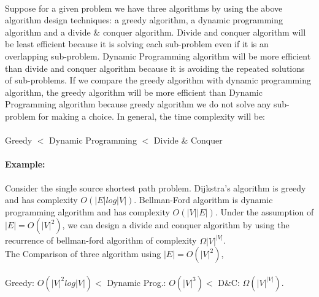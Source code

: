 \documentclass[12pt]{article}
\begin{document}
\maketitle

\paragraph{}
Suppose for a given problem we have three algorithms by using the above algorithm design techniques: a greedy algorithm, a dynamic programming algorithm and a divide \& conquer algorithm. Divide and conquer algorithm will be least efficient because it is solving each sub-problem even if it is an overlapping sub-problem. Dynamic Programming algorithm will be more efficient than divide and conquer algorithm because it is avoiding the repeated solutions of sub-problems. If we compare the greedy algorithm with dynamic programming algorithm, the greedy algorithm will be more efficient than Dynamic Programming algorithm because greedy algorithm we do not solve any sub-problem for making a choice. In general, the time complexity will be:
\\
\\
Greedy $<$ Dynamic Programming $<$ Divide \& Conquer

\paragraph{Example:}
Consider the single source shortest path problem. Dijkstra's algorithm is greedy and has complexity $O(|E|log|V|)$. Bellman-Ford algorithm is dynamic programming algorithm and has complexity $O(|V||E|)$. Under the assumption of $|E| = O(|V|^2)$, we can design a divide and conquer algorithm by using the recurrence of bellman-ford algorithm of complexity $\Omega |V|^{|V|}$. 
\\
The Comparison of three algorithm using $|E| = O(|V|^2)$,
\\
\\
Greedy: $O(|V|^2 log|V|) < $ Dynamic Prog.: $O(|V|^3) < $  D\&C: $\Omega (|V|^{|V|})$.
\end{document}
